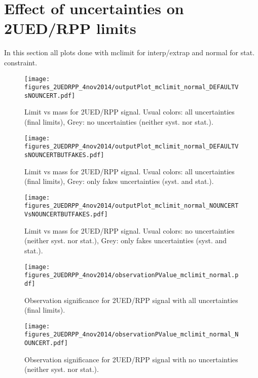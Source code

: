 \documentclass[a4paper,notitlepage]{article}
\begin{document}
  
\section{Effect of uncertainties on 2UED/RPP limits}

In this section all plots done with mclimit for interp/extrap and normal for stat. constraint.

\begin{figure}[!htb]
\begin{center}
\texttt{[image: figures\_2UEDRPP\_4nov2014/outputPlot\_mclimit\_normal\_DEFAULTVsNOUNCERT.pdf]}
\caption{Limit vs mass for 2UED/RPP signal. Usual colors: all uncertainties (final limits), Grey: no uncertainties (neither syst. nor stat.).}
\end{center}
\end{figure} 

\begin{figure}[!htb]
\begin{center}
\texttt{[image: figures\_2UEDRPP\_4nov2014/outputPlot\_mclimit\_normal\_DEFAULTVsNOUNCERTBUTFAKES.pdf]}
\caption{Limit vs mass for 2UED/RPP signal. Usual colors: all uncertainties (final limits), Grey: only fakes uncertainties (syst. and stat.).}
\end{center}
\end{figure} 

\begin{figure}[!htb]
\begin{center}
\texttt{[image: figures\_2UEDRPP\_4nov2014/outputPlot\_mclimit\_normal\_NOUNCERTVsNOUNCERTBUTFAKES.pdf]}
\caption{Limit vs mass for 2UED/RPP signal. Usual colors: no uncertainties (neither syst. nor stat.), Grey: only fakes uncertainties (syst. and stat.).}
\end{center}
\end{figure} 

\begin{figure}[!htb]
\begin{center}
\texttt{[image: figures\_2UEDRPP\_4nov2014/observationPValue\_mclimit\_normal.pdf]}
\caption{Observation significance for 2UED/RPP signal with all uncertainties (final limits).}
\end{center}
\end{figure} 

\begin{figure}[!htb]
\begin{center}
\texttt{[image: figures\_2UEDRPP\_4nov2014/observationPValue\_mclimit\_normal\_NOUNCERT.pdf]}
\caption{Observation significance for 2UED/RPP signal with no uncertainties (neither syst. nor stat.).}
\end{center}
\end{figure} 
\end{document}
